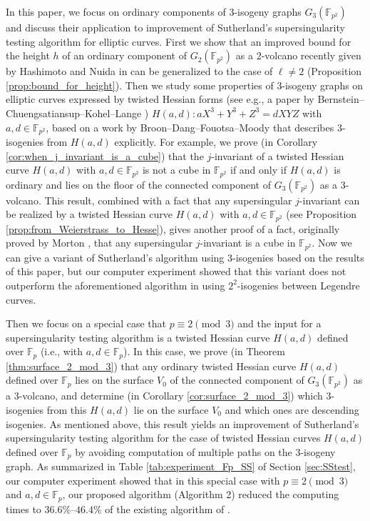 \documentclass{article}
\theoremstyle{definition}
\newcommand{\FF}{\mathbb{F}}
\begin{document}
In this paper, we focus on ordinary components of $3$-isogeny graphs $G_3(\FF_{p^2})$ and discuss their application to improvement of Sutherland's supersingularity testing algorithm for elliptic curves.
First we show that an improved bound for the height $h$ of an ordinary component of $G_2(\FF_{p^2})$ as a $2$-volcano recently given by Hashimoto and Nuida in \cite{hashimoto2024boundsheights2isogenygraphs} can be generalized to the case of $\ell \neq 2$ (Proposition \ref{prop:bound_for_height}).
Then we study some properties of $3$-isogeny graphs on elliptic curves expressed by twisted Hessian forms (see e.g., a paper by Bernstein--Chuengsatiansup--Kohel--Lange \cite{LC:BCKL15}) $H(a,d) \colon a X^3 + Y^3 + Z^3 = d XYZ$ with $a,d \in \FF_{p^2}$, based on a work by Broon--Dang--Fouotsa--Moody \cite{perez2021isogenies} that describes $3$-isogenies from $H(a,d)$ explicitly.
For example, we prove (in Corollary \ref{cor:when_j_invariant_is_a_cube}) that the $j$-invariant of a twisted Hessian curve $H(a,d)$ with $a,d \in \FF_{p^2}$ is not a cube in $\FF_{p^2}$ if and only if $H(a,d)$ is ordinary and lies on the floor of the connected component of $G_3(\FF_{p^2})$ as a $3$-volcano.
This result, combined with a fact that any supersingular $j$-invariant can be realized by a twisted Hessian curve $H(a,d)$ with $a,d \in \FF_{p^2}$ (see Proposition \ref{prop:from_Weierstrass_to_Hesse}), gives another proof of a fact, originally proved by Morton \cite[Theorem 1.2]{morton2011cubic}, that any supersingular $j$-invariant is a cube in $\FF_{p^2}$.
Now we can give a variant of Sutherland's algorithm using $3$-isogenies based on the results of this paper, but our computer experiment showed that this variant does not outperform the aforementioned algorithm in \cite{DBLP:conf/casc/HashimotoN21,DBLP:journals/ieiceta/HashimotoN23} using $2^2$-isogenies between Legendre curves.

Then we focus on a special case that $p \equiv 2 \pmod{3}$ and the input for a supersingularity testing algorithm is a twisted Hessian curve $H(a,d)$ defined over $\FF_p$ (i.e., with $a,d \in \FF_p$).
In this case, we prove (in Theorem \ref{thm:surface_2_mod_3}) that any ordinary twisted Hessian curve $H(a,d)$ defined over $\FF_p$ lies on the surface $V_0$ of the connected component of $G_3(\FF_{p^2})$ as a $3$-volcano, and determine (in Corollary \ref{cor:surface_2_mod_3}) which $3$-isogenies from this $H(a,d)$ lie on the surface $V_0$ and which ones are descending isogenies.
As mentioned above, this result yields an improvement of Sutherland's supersingularity testing algorithm for the case of twisted Hessian curves $H(a,d)$ defined over $\FF_p$ by avoiding computation of multiple paths on the $3$-isogeny graph.
As summarized in Table \ref{tab:experiment_Fp_SS} of Section \ref{sec:SStest}, our computer experiment showed that in this special case with $p \equiv 2 \pmod{3}$ and $a,d \in \FF_p$, our proposed algorithm (Algorithm 2) reduced the computing times to $36.6\%$--$46.4\%$ of the existing algorithm of \cite{DBLP:conf/casc/HashimotoN21,DBLP:journals/ieiceta/HashimotoN23}.
\end{document}
